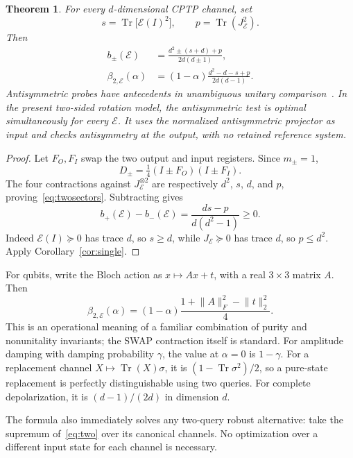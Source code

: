 \documentclass[11pt,a4paper]{article}
\newtheorem{theorem}{Theorem}[section]
\theoremstyle{remark}\newtheorem{remark}[theorem]{Remark}
\DeclareMathOperator{\Tr}{Tr}
\newcommand{\cE}{\mathcal E}
\begin{document}
\begin{theorem}\label{thm:two}
For every $d$-dimensional CPTP channel, set
\begin{equation}
 s=\Tr\bigl[\cE(I)^2\bigr],\qquad p=\Tr(J_{\cE}^2).
\end{equation}
Then
\begin{align}
 b_\pm(\cE)&=\frac{d^2\pm(s+d)+p}{2d(d\pm1)},\label{eq:twosectors}\\
 \beta_{2,\cE}(\alpha)&=(1-\alpha)
 \frac{d^2-d-s+p}{2d(d-1)}.\label{eq:two}
\end{align}
Antisymmetric probes have antecedents in unambiguous unitary comparison~\cite{sedlak}. In the present two-sided rotation model, the antisymmetric test is optimal simultaneously for every $\cE$. It uses the normalized antisymmetric projector as input and checks antisymmetry at the output, with no retained reference system.
\end{theorem}
\begin{proof}
Let $F_O,F_I$ swap the two output and input registers. Since $m_\pm=1$,
\begin{equation}
 D_\pm=\tfrac14(I\pm F_O)(I\pm F_I).
\end{equation}
The four contractions against $J_{\cE}^{\otimes2}$ are respectively $d^2$, $s$, $d$, and $p$, proving~\eqref{eq:twosectors}. Subtracting gives
\begin{equation}
 b_+(\cE)-b_-(\cE)=\frac{ds-p}{d(d^2-1)}\geq0.
\end{equation}
Indeed $\cE(I)\succeq0$ has trace $d$, so $s\geq d$, while $J_{\cE}\succeq0$ has trace $d$, so $p\leq d^2$. Apply Corollary~\ref{cor:single}.
\end{proof}

For qubits, write the Bloch action as $x\mapsto Ax+t$, with a real $3\times3$ matrix $A$. Then
\begin{equation}\label{eq:bloch}
 \beta_{2,\cE}(\alpha)=(1-\alpha)
 \frac{1+\lVert A\rVert_F^2-\lVert t\rVert_2^2}{4}.
\end{equation}
This is an operational meaning of a familiar combination of purity and nonunitality invariants; the SWAP contraction itself is standard. For amplitude damping with damping probability $\gamma$, the value at $\alpha=0$ is $1-\gamma$. For a replacement channel $X\mapsto\Tr(X)\sigma$, it is $(1-\Tr\sigma^2)/2$, so a pure-state replacement is perfectly distinguishable using two queries. For complete depolarization, it is $(d-1)/(2d)$ in dimension $d$.

The formula also immediately solves any two-query robust alternative: take the supremum of~\eqref{eq:two} over its canonical channels. No optimization over a different input state for each channel is necessary.
\end{document}
